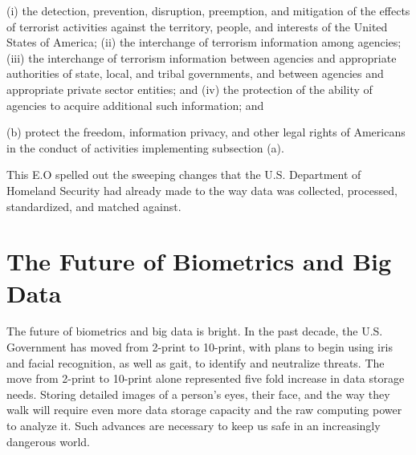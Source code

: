 \documentclass[sigconf]{acmart}
\begin{document}
        (i) the detection, prevention, disruption, preemption, and mitigation of the effects of terrorist activities against the territory, people, and interests of the United States of America; 
        (ii) the interchange of terrorism information among agencies; 
        (iii) the interchange of terrorism information between agencies and appropriate authorities of state, local, and tribal governments, and between agencies and appropriate private sector entities; and 
        (iv) the protection of the ability of agencies to acquire additional such information; and 
        
    (b) protect the freedom, information privacy, and other legal rights of Americans in the conduct of activities implementing subsection (a). 
    
This E.O spelled out the sweeping changes that the U.S. Department of Homeland Security had already made to the way data was collected, processed, standardized, and matched against. 

\section{The Future of Biometrics and Big Data}

The future of biometrics and big data is bright. In the past decade, the U.S. Government has moved from 2-print to 10-print, with plans to begin using iris and facial recognition, as well as gait, to identify and neutralize threats. The move from 2-print to 10-print alone represented five fold increase in data storage needs. Storing detailed images of a person's eyes, their face, and the way they walk will require even more data storage capacity and the raw computing power to analyze it. Such advances are necessary to keep us safe in an increasingly dangerous world.


 
\end{document}
